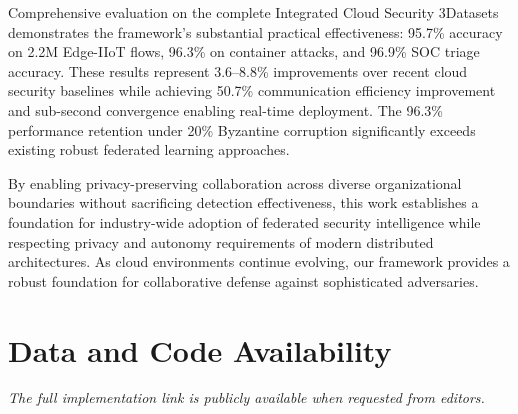 \documentclass[12pt,a4paper]{article}
\theoremstyle{definition}
\begin{document}
Comprehensive evaluation on the complete Integrated Cloud Security 3Datasets demonstrates the framework's substantial practical effectiveness: 95.7\% accuracy on 2.2M Edge-IIoT flows, 96.3\% on container attacks, and 96.9\% SOC triage accuracy. These results represent 3.6--8.8\% improvements over recent cloud security baselines while achieving 50.7\% communication efficiency improvement and sub-second convergence enabling real-time deployment. The 96.3\% performance retention under 20\% Byzantine corruption significantly exceeds existing robust federated learning approaches.

By enabling privacy-preserving collaboration across diverse organizational boundaries without sacrificing detection effectiveness, this work establishes a foundation for industry-wide adoption of federated security intelligence while respecting privacy and autonomy requirements of modern distributed architectures. As cloud environments continue evolving, our framework provides a robust foundation for collaborative defense against sophisticated adversaries.

\section*{Data and Code Availability}

\textit{The full implementation link is publicly available when requested from editors.}
\end{document}
